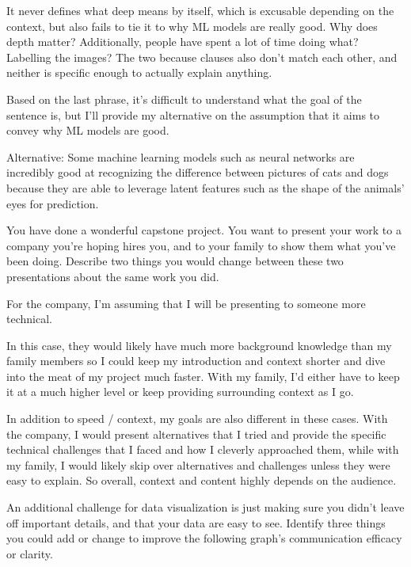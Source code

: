 \documentclass{article}
\begin{document}
\begin{probset}
\begin{prob}
\begin{soln}
        It never defines what deep means by itself, which is excusable depending on the context, but also fails to tie it to why ML models are really good. Why does depth matter? Additionally, people have spent a lot of time doing what? Labelling the images? The two because clauses also don't match each other, and neither is specific enough to actually explain anything.

        Based on the last phrase, it's difficult to understand what the goal of the sentence is, but I'll provide my alternative on the assumption that it aims to convey why ML models are good.

        Alternative: Some machine learning models such as neural networks are incredibly good at recognizing the difference between pictures of cats and dogs because they are able to leverage latent features such as the shape of the animals' eyes for prediction.
    \end{soln}
\end{prob}

\newpage

\begin{prob}
    You have done a wonderful capstone project. You want to present your work to a company you're hoping hires you, and to your family to show them what you've been doing. Describe two things you would change between these two presentations about the same work you did.

    \begin{soln}
        For the company, I'm assuming that I will be presenting to someone more technical. 

        In this case, they would likely have much more background knowledge than my family members so I could keep my introduction and context shorter and dive into the meat of my project much faster. With my family, I'd either have to keep it at a much higher level or keep providing surrounding context as I go.

        In addition to speed / context, my goals are also different in these cases. With the company, I would present alternatives that I tried and provide the specific technical challenges that I faced and how I cleverly approached them, while with my family, I would likely skip over alternatives and challenges unless they were easy to explain. So overall, context and content highly depends on the audience.
    \end{soln}
\end{prob}

\begin{prob}
    An additional challenge for data visualization is just making sure you didn't leave off important details, and that your data are easy to see. Identify three things you could add or change to improve the following graph's communication efficacy or clarity.


\end{prob}
\end{probset}
\end{document}
